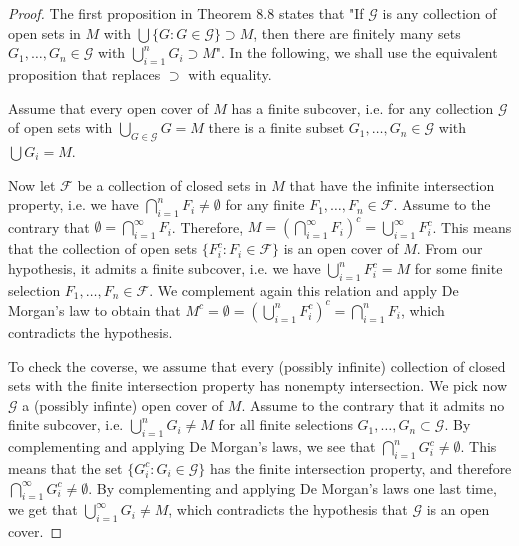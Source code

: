\begin{proof}

The first proposition in Theorem 8.8 states that "If $\mathcal{G}$ is any collection of open sets in $M$ with $\bigcup \{G: G\in \mathcal{G}\} \supset M$, then there are finitely many sets $G_1, \dots, G_n \in \mathcal{G}$ with $\bigcup_{i=1}^n G_i \supset M$".
In the following, we shall use the equivalent proposition that replaces $\supset$ with equality.

\vspace{1em}

Assume that every open cover of $M$ has a finite subcover, i.e. for any collection $\mathcal{G}$ of open sets with $\bigcup_{G \in \mathcal{G}} G = M$ there is a finite subset $G_1, \dots, G_n \in \mathcal{G}$ with $\bigcup G_i = M$.

Now let $\mathcal{F}$ be a collection of closed sets in $M$ that have the infinite intersection property, i.e. we have $\bigcap_{i=1}^n F_i \neq \emptyset$ for any finite  $F_1, \dots, F_n \in \mathcal{F}$. Assume to the contrary that $\emptyset = \bigcap_{i=1}^\infty F_i$. Therefore, $M = (\bigcap_{i=1}^\infty F_i)^c = \bigcup_{i=1}^\infty F_i^c$. This means that the collection of open sets $\{F_i^c: F_i \in \mathcal{F}\}$ is an open cover of $M$. From our hypothesis, it admits a finite subcover, i.e. we have $\bigcup_{i=1}^n F_i^c = M$ for some finite selection $F_1, \dots, F_n \in \mathcal{F}$. We complement again this relation and apply De Morgan's law to obtain that $M^c = \emptyset = (\bigcup_{i=1}^n F_i^c)^c = \bigcap_{i=1}^n F_i$, which contradicts the hypothesis.

\vspace{1em}

To check the coverse, we assume that every (possibly infinite) collection of closed sets with the finite intersection property has nonempty intersection. We pick now $\mathcal{G}$ a (possibly infinte) open cover of $M$. Assume to the contrary that it admits no finite subcover, i.e. $\bigcup_{i=1}^n G_i \neq M$ for all finite selections $G_1, \dots, G_n \subset \mathcal{G}$. By complementing and applying De Morgan's laws, we see that $\bigcap_{i=1}^n G_i^c \neq \emptyset$. This means that the set $\{G_i^c: G_i \in \mathcal{G}\}$ has the finite intersection property, and therefore $\bigcap_{i=1}^\infty G_i^c \neq \emptyset$. By complementing and applying De Morgan's laws one last time, we get that $\bigcup_{i=1}^\infty G_i \neq M$, which contradicts the hypothesis that $\mathcal{G}$ is an open cover.


\end{proof}

